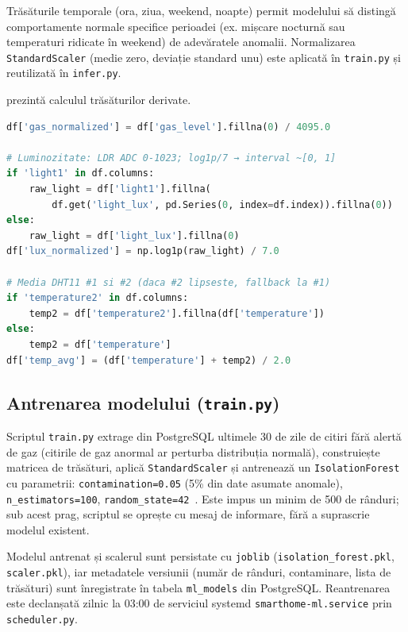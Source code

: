 Trăsăturile temporale (ora, ziua, weekend, noapte) permit modelului să
distingă comportamente normale specifice perioadei (ex. mișcare
nocturnă sau temperaturi ridicate în weekend) de adevăratele anomalii.
Normalizarea \texttt{StandardScaler} (medie zero, deviație standard unu)
este aplicată în \texttt{train.py} și reutilizată în \texttt{infer.py}.

 prezintă calculul trăsăturilor derivate.

\begin{lstlisting}[language=Python,
  caption={Calcul trăsături derivate în \texttt{features.py} —
           normalizare gaz, lumină și media DHT11.},
  label=lst:features]
df['gas_normalized'] = df['gas_level'].fillna(0) / 4095.0

# Luminozitate: LDR ADC 0-1023; log1p/7 → interval ~[0, 1]
if 'light1' in df.columns:
    raw_light = df['light1'].fillna(
        df.get('light_lux', pd.Series(0, index=df.index)).fillna(0))
else:
    raw_light = df['light_lux'].fillna(0)
df['lux_normalized'] = np.log1p(raw_light) / 7.0

# Media DHT11 #1 si #2 (daca #2 lipseste, fallback la #1)
if 'temperature2' in df.columns:
    temp2 = df['temperature2'].fillna(df['temperature'])
else:
    temp2 = df['temperature']
df['temp_avg'] = (df['temperature'] + temp2) / 2.0
\end{lstlisting}

\subsection{Antrenarea modelului (\texttt{train.py})}
\label{sec:train}

Scriptul \texttt{train.py} extrage din PostgreSQL ultimele 30 de zile de
citiri fără alertă de gaz (citirile de gaz anormal ar perturba distribuția
normală), construiește matricea de trăsături, aplică
\texttt{StandardScaler} și antrenează un \texttt{IsolationForest} cu
parametrii: \texttt{contamination=0.05} (5\% din date asumate anomale),
\texttt{n\_estimators=100}, \texttt{random\_state=42}~\cite{liu2008isolation}.
Este impus un minim de 500 de rânduri; sub acest prag, scriptul se
oprește cu mesaj de informare, fără a suprascrie modelul existent.

Modelul antrenat și scalerul sunt persistate cu \texttt{joblib}
(\texttt{isolation\_forest.pkl}, \texttt{scaler.pkl}), iar metadatele
versiunii (număr de rânduri, contaminare, lista de trăsături) sunt
înregistrate în tabela \texttt{ml\_models} din PostgreSQL.
Reantrenarea este declanșată zilnic la 03:00 de serviciul systemd
\texttt{smarthome-ml.service} prin \texttt{scheduler.py}.

